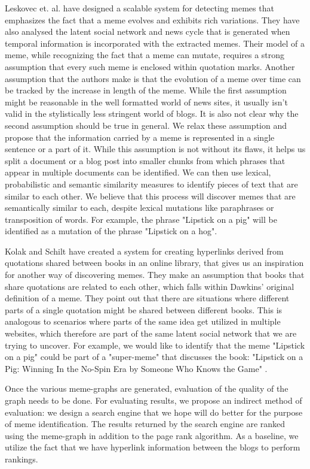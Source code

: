\documentclass{acm_proc_article-sp}
\begin{document}
Leskovec et. al. \cite{leskovec2009meme} have designed a scalable system for detecting memes that emphasizes the fact that a meme evolves and exhibits rich variations. They have also analysed the latent social network and news cycle that is generated when temporal information is incorporated with the extracted memes. Their model of a meme, while recognizing the fact that a meme can mutate, requires a strong assumption that every such meme is enclosed within quotation marks. Another assumption that the authors make is that the evolution of a meme over time can be tracked by the increase in length of the meme. While the first assumption might be reasonable in the well formatted world of news sites, it usually isn't valid in the stylistically less stringent world of blogs. It is also not clear why the second assumption should be true in general. We relax these assumption and propose that the information carried by a meme is represented in a single sentence or a part of it. While this assumption is not without its flaws, it helps us split a document or a blog post into smaller chunks from which phrases that appear in multiple documents can be identified. We can then use lexical, probabilistic and semantic similarity measures to identify pieces of text that are similar to each other. We believe that this process will discover memes that are semantically similar to each, despite lexical mutations like paraphrases or transposition of words. For example, the phrase "Lipstick on a pig" will be identified as a mutation of the phrase "Lipstick on a hog". 

Kolak and Schilt \cite{kolak2008generating} have created a system for creating hyperlinks derived from quotations shared between books in an online library, that gives us an inspiration for another way of discovering memes. They make an assumption that books that share quotations are related to each other, which falls within Dawkins' original definition of a meme. They point out that there are situations where different parts of a single quotation might be shared between different books. This is analogous to scenarios where parts of the same idea get utilized in multiple websites, which therefore are part of the same latent social network that we are trying to uncover. For example, we would like to identify that the meme "Lipstick on a pig" could be part of a "super-meme" that discusses the book: "Lipstick on a Pig: Winning In the No-Spin Era by Someone Who Knows the Game" \cite{clarke2006lipstick}.  


Once the various meme-graphs are generated, evaluation of the quality of the graph needs to be done. For evaluating results, we propose an indirect method of evaluation: we design a search engine that we hope will do better for the purpose of meme identification. The results returned by the search engine are ranked using the meme-graph in addition to the page rank algorithm. As a baseline, we utilize the fact that we have hyperlink information between the blogs to perform rankings. 
\end{document}
